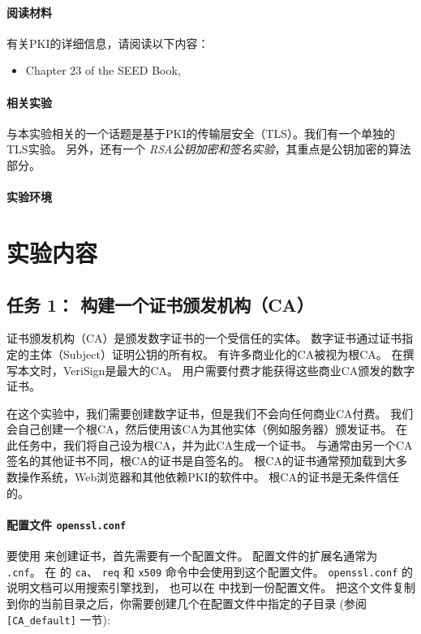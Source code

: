 \paragraph{阅读材料}
有关PKI的详细信息，请阅读以下内容：

\begin{itemize}
\item Chapter 23 of the SEED Book, \seedbook
\end{itemize}


\paragraph{相关实验}

与本实验相关的一个话题是基于PKI的传输层安全（TLS）。我们有一个单独的TLS实验。
另外，还有一个 \textit{RSA公钥加密和签名实验}，其重点是公钥加密的算法部分。


\paragraph{实验环境} \seedenvironment



\section{实验内容}


\subsection{任务 1： 构建一个证书颁发机构（CA）}

证书颁发机构（CA）是颁发数字证书的一个受信任的实体。
数字证书通过证书指定的主体（Subject）证明公钥的所有权。
有许多商业化的CA被视为根CA。
在撰写本文时，VeriSign是最大的CA。
用户需要付费才能获得这些商业CA颁发的数字证书。


在这个实验中，我们需要创建数字证书，但是我们不会向任何商业CA付费。
我们会自己创建一个根CA，然后使用该CA为其他实体（例如服务器）颁发证书。
在此任务中，我们将自己设为根CA，并为此CA生成一个证书。
与通常由另一个CA签名的其他证书不同，根CA的证书是自签名的。
根CA的证书通常预加载到大多数操作系统，Web浏览器和其他依赖PKI的软件中。
根CA的证书是无条件信任的。


\paragraph{配置文件 {\tt openssl.conf}}
要使用 \OpenSSL 来创建证书，首先需要有一个配置文件。
配置文件的扩展名通常为 {\tt .cnf}。
在 \OpenSSL 的 {\tt ca}、 {\tt req} 和 {\tt x509} 命令中会使用到这个配置文件。
\texttt{openssl.conf} 的说明文档可以用搜索引擎找到，
也可以在  中找到一份配置文件。
把这个文件复制到你的当前目录之后，你需要创建几个在配置文件中指定的子目录
(参阅 {\tt [CA\_default]} 一节):


